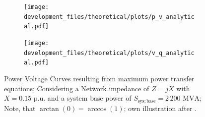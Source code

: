 \begin{figure}[htbp!]
    \centering
    \begin{subfigure}[b]{.49\linewidth}
        \texttt{[image: development\_files/theoretical/plots/p\_v\_analytical.pdf]}
    \end{subfigure}
    \begin{subfigure}[b]{.49\linewidth}
        \texttt{[image: development\_files/theoretical/plots/v\_q\_analytical.pdf]}
    \end{subfigure}
    \caption[Power Voltage Curves resulting from maximum power transfer equations]{Power Voltage Curves resulting from maximum power transfer equations; Considering a Network impedance of $\underline{Z}=jX$ with $X=0.15\text{ p.u.}$ and a system base power of $S_\mathrm{sys;base}=2\,200\text{ MVA}$; Note, that $\arctan(0) = \arccos(1)$; own illustration after \autocite{machowski_2020,kundur_2022,cutsem_1998}.}
    \label{fig:v-stability-system}
\end{figure}

